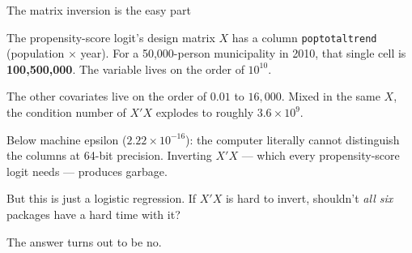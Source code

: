 \documentclass[aspectratio=169,11pt]{beamer}
\begin{document}
\begin{frame}{The matrix inversion is the easy part}

The propensity-score logit's design matrix $X$ has a column \texttt{poptotaltrend} (population $\times$ year). For a 50{,}000-person municipality in 2010, that single cell is \textbf{100{,}500{,}000}. The variable lives on the order of $10^{10}$.

\vspace{0.25cm}

The other covariates live on the order of $0.01$ to $16{,}000$. Mixed in the same $X$, the condition number of $X'X$ explodes to roughly \textbf{$3.6\times 10^{9}$}.

\vspace{0.25cm}

Below machine epsilon ($2.22\times 10^{-16}$): the computer literally cannot distinguish the columns at 64-bit precision. Inverting $X'X$ --- which every propensity-score logit needs --- produces garbage.

\vspace{0.35cm}

\alert{But this is just a logistic regression. If $X'X$ is hard to invert, shouldn't \emph{all six} packages have a hard time with it?}

\vspace{0.15cm}

The answer turns out to be no.

\end{frame}
\end{document}
